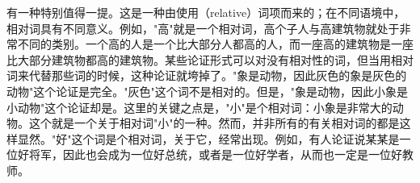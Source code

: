 \begin{examplebox}[title=相对词的歧义问题]
有一种特别值得一提。这是一种由使用（relative）词项而来的；在不同语境中，相对词具有不同意义。例如，"高"就是一个相对词，高个子人与高建筑物就处于非常不同的类别。一个高的人是一个比大部分人都高的人，而一座高的建筑物是一座比大部分建筑物都高的建筑物。某些论证形式可以对没有相对性的词，但当用相对词来代替那些词的时候，这种论证就垮掉了。"象是动物，因此灰色的象是灰色的动物"这个论证是完全。"灰色"这个词不是相对的。但是，"象是动物，因此小象是小动物"这个论证却是。这里的关键之点是，"小"是个相对词：小象是非常大的动物。这个就是一个关于相对词"小"的一种。然而，并非所有的有关相对词的都是这样显然。"好"这个词是个相对词，关于它，经常出现。例如，有人论证说某某是一位好将军，因此也会成为一位好总统，或者是一位好学者，从而也一定是一位好教师。
\end{examplebox}